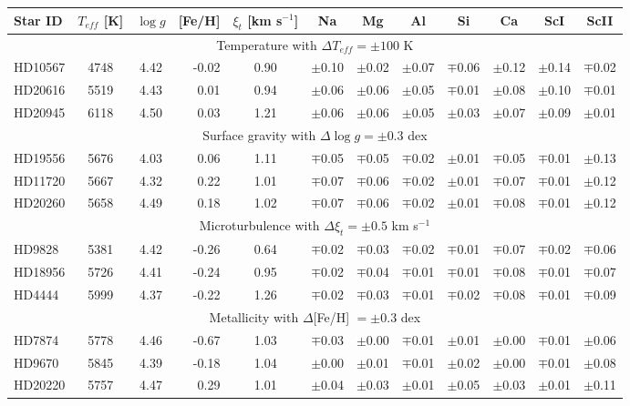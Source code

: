 \documentclass[oldversion]{aa}
\newcommand\T{\rule{0pt}{2.6ex}}
\newcommand\B{\rule[-1.2ex]{0pt}{0pt}}
\begin{document}
\begin{table}[t!]
\begin{tabular}{ l c c r c c c c c c c c}
  \hline
  \hline
Star ID \T & $T_{eff}$ [K] & $\log g$ & [Fe/H] & $\xi_t$ [km s$^{-1}$] & Na & Mg & Al & Si & Ca & ScI & ScII\\
\hline
\multicolumn {12}{c}{Temperature with $\Delta T_{eff}=\pm100$ K} \\
HD10567 & 4748 & 4.42 & -0.02 & 0.90 & $\pm$0.10 & $\pm$0.02 & $\pm$0.07 & $\mp$0.06 & $\pm$0.12 & $\pm$0.14 & $\mp$0.02 \\
HD20616 & 5519 & 4.43 &  0.01 & 0.94 & $\pm$0.06 & $\pm$0.06 & $\pm$0.05 & $\mp$0.01 & $\pm$0.08 & $\pm$0.10 & $\mp$0.01 \\
HD20945 & 6118 & 4.50 &  0.03 & 1.21 & $\pm$0.06 & $\pm$0.06 & $\pm$0.05 & $\pm$0.03 & $\pm$0.07 & $\pm$0.09 & $\pm$0.01 \\
\multicolumn {12}{c}{Surface gravity with $\Delta\log g=\pm0.3$ dex} \\
HD19556 & 5676 & 4.03 &  0.06 & 1.11 & $\mp$0.05 & $\mp$0.05 & $\mp$0.02 & $\pm$0.01 & $\mp$0.05 & $\mp$0.01 & $\pm$0.13 \\
HD11720 & 5667 & 4.32 &  0.22 & 1.01 & $\mp$0.07 & $\mp$0.06 & $\mp$0.02 & $\pm$0.01 & $\mp$0.07 & $\mp$0.01 & $\pm$0.12 \\
HD20260 & 5658 & 4.49 &  0.18 & 1.02 & $\mp$0.07 & $\mp$0.06 & $\mp$0.02 & $\pm$0.01 & $\mp$0.08 & $\mp$0.01 & $\pm$0.12 \\
\multicolumn {12}{c}{Microturbulence with $\Delta \xi_t=\pm0.5$ km s$^{-1}$} \\
HD9828 & 5381 & 4.42 & -0.26 & 0.64 & $\mp$0.02 & $\mp$0.03 & $\mp$0.02 & $\mp$0.01 & $\mp$0.07 & $\mp$0.02 & $\mp$0.06 \\
HD18956 & 5726 & 4.41 & -0.24 & 0.95 & $\mp$0.02 & $\mp$0.04 & $\mp$0.01 & $\mp$0.01 & $\mp$0.08 & $\mp$0.01 & $\mp$0.07 \\
HD4444 & 5999 & 4.37 & -0.22 & 1.26 & $\mp$0.02 & $\mp$0.03 & $\mp$0.01 & $\mp$0.02 & $\mp$0.08 & $\mp$0.01 & $\mp$0.09 \\
\multicolumn {12}{c}{Metallicity with $\Delta$[Fe/H] $=\pm$0.3 dex} \\
HD7874 & 5778 & 4.46 & -0.67 & 1.03 & $\mp$0.03 & $\pm$0.00 & $\mp$0.01 & $\pm$0.01 & $\pm$0.00 & $\mp$0.01 & $\pm$0.06 \\
HD9670 & 5845 & 4.39 & -0.18 & 1.04 & $\pm$0.00 & $\pm$0.01 & $\mp$0.01 & $\pm$0.02 & $\pm$0.00 & $\mp$0.01 & $\pm$0.08 \\
HD20220 & 5757 & 4.47 &  0.29 & 1.01 & $\pm$0.04 & $\pm$0.03 & $\pm$0.01 & $\pm$0.05 & $\pm$0.03 & $\pm$0.01 & $\pm$0.11 \\


\end{tabular}
\end{table}
\end{document}
